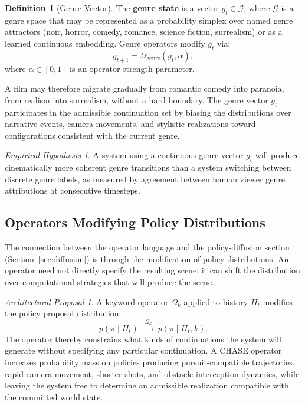 \documentclass[11pt,a4paper]{article}
\theoremstyle{plain}
\theoremstyle{definition}
\newtheorem{definition}[theorem]{Definition}
\theoremstyle{remark}
\newtheorem{hypothesis}[theorem]{Empirical Hypothesis}
\newtheorem{proposal}[theorem]{Architectural Proposal}
\begin{document}
\begin{definition}[Genre Vector]
The \textbf{genre state} is a vector $g_t \in \mathcal{G}$, where $\mathcal{G}$ is a genre space that may be represented as a probability simplex over named genre attractors (noir, horror, comedy, romance, science fiction, surrealism) or as a learned continuous embedding. Genre operators modify $g_t$ via:
\[
g_{t+1} = \Omega_{\mathrm{genre}}(g_t, \alpha),
\]
where $\alpha \in [0,1]$ is an operator strength parameter.
\end{definition}

A film may therefore migrate gradually from romantic comedy into paranoia, from realism into surrealism, without a hard boundary. The genre vector $g_t$ participates in the admissible continuation set by biasing the distributions over narrative events, camera movements, and stylistic realizations toward configurations consistent with the current genre.

\begin{hypothesis}
\label{hyp:genre-continuous}
A system using a continuous genre vector $g_t$ will produce cinematically more coherent genre transitions than a system switching between discrete genre labels, as measured by agreement between human viewer genre attributions at consecutive timesteps.
\end{hypothesis}

\subsection{Operators Modifying Policy Distributions}

The connection between the operator language and the policy-diffusion section (Section~\ref{sec:diffusion}) is through the modification of policy distributions. An operator need not directly specify the resulting scene; it can shift the distribution over computational strategies that will produce the scene.

\begin{proposal}
A keyword operator $\Omega_k$ applied to history $H_t$ modifies the policy proposal distribution:
\[
p(\pi \mid H_t) \;\xrightarrow{\;\Omega_k\;}\; p(\pi \mid H_t, k).
\]
The operator thereby constrains what kinds of continuations the system will generate without specifying any particular continuation. A \textsc{CHASE} operator increases probability mass on policies producing pursuit-compatible trajectories, rapid camera movement, shorter shots, and obstacle-interception dynamics, while leaving the system free to determine an admissible realization compatible with the committed world state.
\end{proposal}
\end{document}
